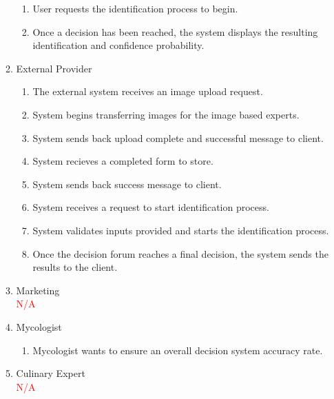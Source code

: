 \documentclass[]{article}
\begin{document}
\begin{enumerate}[{\bf BE1.}]
\begin{enumerate}[{\bf VP1.}]
\begin{enumerate}[1.]
					\item User requests the identification process to begin.
					\item Once a decision has been reached, the system displays the resulting identification and confidence probability.
				\end{enumerate}
			\item External Provider\\
				\begin{enumerate}[1.]
					\item The external system receives an image upload request.
					\item System begins transferring images for the image based experts.
					\item System sends back upload complete and successful message to client.
					\item System recieves a completed form to store.
					\item System sends back success message to client.
					\item System receives a request to start identification process.
					\item System validates inputs provided and starts the identification process.
					\item Once the decision forum reaches a final decision, the system sends the results to the client.
				\end{enumerate}
			\item Marketing\\
				\textcolor{red}{N/A}
			\item Mycologist\\
				\begin{enumerate}[1.]
					\item Mycologist wants to ensure an overall decision system accuracy rate.
				\end{enumerate}
			\item Culinary Expert\\
				\textcolor{red}{N/A}
		\end{enumerate}
		

\end{enumerate}
\end{document}
